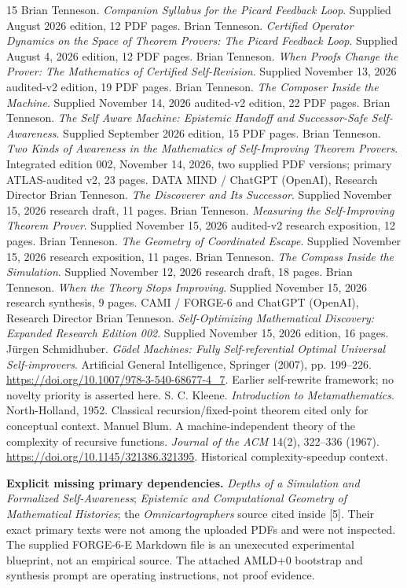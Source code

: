 \documentclass[11pt,letterpaper]{article}
\theoremstyle{definition}
\theoremstyle{remark}
\newcommand{\src}[1]{\textup{[#1]}}
\begin{document}
\begin{thebibliography}{15}\small
{} Brian Tenneson. \emph{Companion Syllabus for the Picard Feedback Loop}. Supplied August 2026 edition, 12 PDF pages.
 Brian Tenneson. \emph{Certified Operator Dynamics on the Space of Theorem Provers: The Picard Feedback Loop}. Supplied August 4, 2026 edition, 12 PDF pages.
 Brian Tenneson. \emph{When Proofs Change the Prover: The Mathematics of Certified Self-Revision}. Supplied November 13, 2026 audited-v2 edition, 19 PDF pages.
 Brian Tenneson. \emph{The Composer Inside the Machine}. Supplied November 14, 2026 audited-v2 edition, 22 PDF pages.
 Brian Tenneson. \emph{The Self Aware Machine: Epistemic Handoff and Successor-Safe Self-Awareness}. Supplied September 2026 edition, 15 PDF pages.
 Brian Tenneson. \emph{Two Kinds of Awareness in the Mathematics of Self-Improving Theorem Provers}. Integrated edition 002, November 14, 2026, two supplied PDF versions; primary ATLAS-audited v2, 23 pages.
 DATA MIND / ChatGPT (OpenAI), Research Director Brian Tenneson. \emph{The Discoverer and Its Successor}. Supplied November 15, 2026 research draft, 11 pages.
 Brian Tenneson. \emph{Measuring the Self-Improving Theorem Prover}. Supplied November 15, 2026 audited-v2 research exposition, 12 pages.
 Brian Tenneson. \emph{The Geometry of Coordinated Escape}. Supplied November 15, 2026 research exposition, 11 pages.
 Brian Tenneson. \emph{The Compass Inside the Simulation}. Supplied November 12, 2026 research draft, 18 pages.
 Brian Tenneson. \emph{When the Theory Stops Improving}. Supplied November 15, 2026 research synthesis, 9 pages.
 CAMI / FORGE-6 and ChatGPT (OpenAI), Research Director Brian Tenneson. \emph{Self-Optimizing Mathematical Discovery: Expanded Research Edition 002}. Supplied November 15, 2026 edition, 16 pages.
 J\"urgen Schmidhuber. \emph{G\"odel Machines: Fully Self-referential Optimal Universal Self-improvers}. Artificial General Intelligence, Springer (2007), pp. 199--226. \url{https://doi.org/10.1007/978-3-540-68677-4_7}. Earlier self-rewrite framework; no novelty priority is asserted here.
 S. C. Kleene. \emph{Introduction to Metamathematics}. North-Holland, 1952. Classical recursion/fixed-point theorem cited only for conceptual context.
 Manuel Blum. A machine-independent theory of the complexity of recursive functions. \emph{Journal of the ACM} 14(2), 322--336 (1967). \url{https://doi.org/10.1145/321386.321395}. Historical complexity-speedup context.
\end{thebibliography}
\noindent\textbf{Explicit missing primary dependencies.} \emph{Depths of a Simulation and Formalized Self-Awareness}; \emph{Epistemic and Computational Geometry of Mathematical Histories}; the \emph{Omnicartographers} source cited inside \src{5}. Their exact primary texts were not among the uploaded PDFs and were not inspected. The supplied FORGE-6-E Markdown file is an unexecuted experimental blueprint, not an empirical source. The attached AMLD+0 bootstrap and synthesis prompt are operating instructions, not proof evidence.
\end{document}

